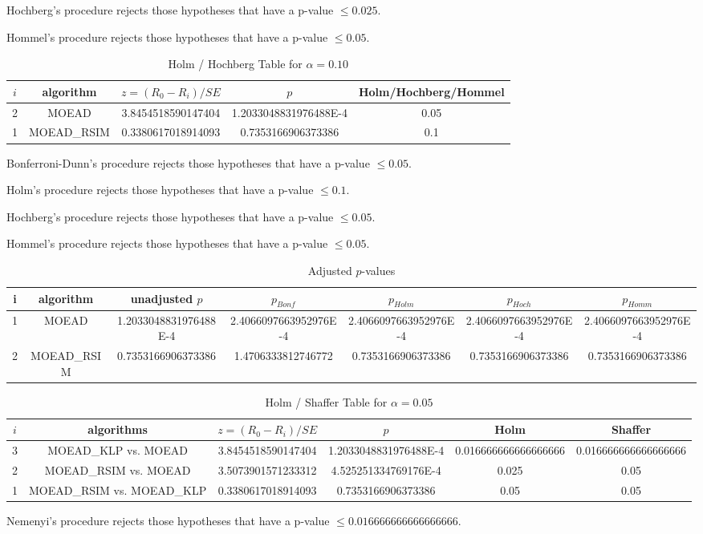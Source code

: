 \documentclass[a4paper,10pt]{article}
\begin{document}
\begin{landscape}
Hochberg's procedure rejects those hypotheses that have a p-value $\le0.025$.


Hommel's procedure rejects those hypotheses that have a p-value $\le0.05$.


\begin{table}[!htp]
\centering\tiny
\caption{Holm / Hochberg Table for $\alpha=0.10$}
\begin{tabular}{ccccc}
$i$&algorithm&$z=(R_0 - R_i)/SE$&$p$&Holm/Hochberg/Hommel\\
\hline
2&MOEAD&3.8454518590147404&1.2033048831976488E-4&0.05\\
1&MOEAD_RSIM&0.3380617018914093&0.7353166906373386&0.1\\
\hline
\end{tabular}
\end{table}
Bonferroni-Dunn's procedure rejects those hypotheses that have a p-value $\le0.05$.


Holm's procedure rejects those hypotheses that have a p-value $\le0.1$.


Hochberg's procedure rejects those hypotheses that have a p-value $\le0.05$.


Hommel's procedure rejects those hypotheses that have a p-value $\le0.05$.


\begin{table}[!htp]
\centering\tiny
\caption{Adjusted $p$-values}
\begin{tabular}{ccccccc}
i&algorithm&unadjusted $p$&$p_{Bonf}$&$p_{Holm}$&$p_{Hoch}$&$p_{Homm}$\\
\hline
1&MOEAD&1.2033048831976488E-4&2.4066097663952976E-4&2.4066097663952976E-4&2.4066097663952976E-4&2.4066097663952976E-4\\
2&MOEAD_RSIM&0.7353166906373386&1.4706333812746772&0.7353166906373386&0.7353166906373386&0.7353166906373386\\
\hline
\end{tabular}
\end{table}

\begin{table}[!htp]
\centering\tiny
\caption{Holm / Shaffer Table for $\alpha=0.05$}
\begin{tabular}{cccccc}
$i$&algorithms&$z=(R_0 - R_i)/SE$&$p$&Holm&Shaffer\\
\hline
3&MOEAD_KLP vs. MOEAD&3.8454518590147404&1.2033048831976488E-4&0.016666666666666666&0.016666666666666666\\
2&MOEAD_RSIM vs. MOEAD&3.5073901571233312&4.525251334769176E-4&0.025&0.05\\
1&MOEAD_RSIM vs. MOEAD_KLP&0.3380617018914093&0.7353166906373386&0.05&0.05\\
\hline
\end{tabular}
\end{table}
Nemenyi's procedure rejects those hypotheses that have a p-value $\le0.016666666666666666$.



\end{landscape}
\end{document}
